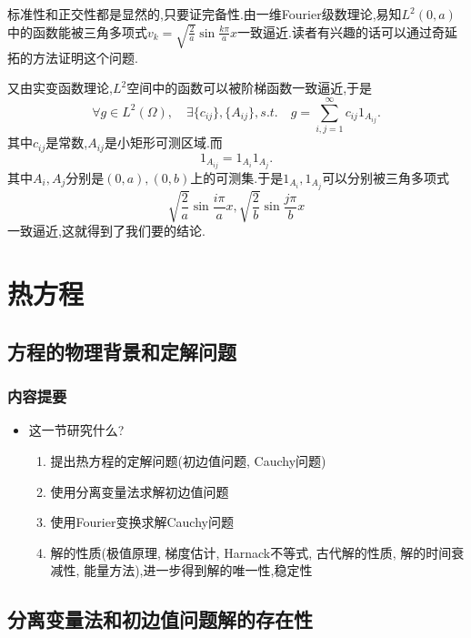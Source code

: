 \documentclass[12pt, a4paper]{ctexbook}
\begin{document}
    标准性和正交性都是显然的,只要证完备性.由一维Fourier级数理论,易知$L^2(0,a)$中的函数能被三角多项式$v_k = \sqrt{\frac2a}\sin\frac{k\pi}{a}x$一致逼近.读者有兴趣的话可以通过奇延拓的方法证明这个问题.
    
    又由实变函数理论,$L^2$空间中的函数可以被阶梯函数一致逼近,于是
    \begin{equation*}
    \forall g \in L^2(\Omega),\quad \exists \{c_{ij}\},\{A_{ij}\} ,s.t. \quad g = \sum_{i,j=1}^{\infty}c_{ij}1_{A_{ij}}.
    \end{equation*}
    其中$c_{ij}$是常数,$A_{ij}$是小矩形可测区域.而
    \begin{equation*}
    1_{A_{ij}} = 1_{A_{i}} 1_{A_{j}}.
    \end{equation*}
    其中$A_{i},A_{j}$分别是$(0,a),(0,b)$上的可测集.于是$1_{A_{i}},1_{A_{j}}$可以分别被三角多项式$$\sqrt{\frac2a}\sin\frac{i\pi}{a}x,\sqrt{\frac2b}\sin\frac{j\pi}{b}x$$一致逼近,这就得到了我们要的结论.
    
    \chapter{热方程}
    \section{方程的物理背景和定解问题}
    
    \subsection{内容提要}
    \begin{itemize}
        \item 这一节研究什么?
        \begin{enumerate}
            \item 提出热方程的定解问题(初边值问题, Cauchy问题)
            \item 使用分离变量法求解初边值问题
            \item 使用Fourier变换求解Cauchy问题
            \item 解的性质(极值原理, 梯度估计, Harnack不等式, 古代解的性质, 解的时间衰减性, 能量方法),进一步得到解的唯一性,稳定性
        \end{enumerate}
    \end{itemize}
    
    \section{分离变量法和初边值问题解的存在性}
\end{document}
